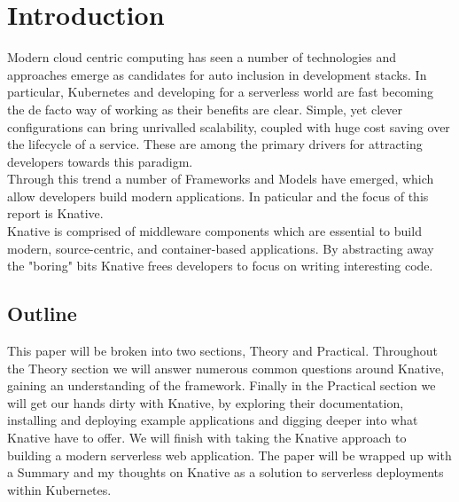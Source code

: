 \section{Introduction}
Modern cloud centric computing has seen a number of technologies and approaches emerge as candidates for auto inclusion in development stacks. In particular,  Kubernetes and developing for a serverless world are fast becoming the de facto way of working as their benefits are clear. Simple, yet clever configurations can bring unrivalled scalability, coupled with huge cost saving over the lifecycle of a service. These are among the primary drivers for attracting developers towards this paradigm.
\\Through this trend a number of Frameworks and Models have emerged, which allow developers build modern applications. In paticular and the focus of this report is Knative.
\\Knative is comprised of middleware components which are essential to build modern, source-centric, and container-based applications. By abstracting away the "boring" bits Knative frees developers to focus on writing interesting code.
\subsection{Outline}
This paper will be broken into two sections, Theory and Practical. Throughout the Theory section we will answer numerous common questions around Knative, gaining an understanding of the framework. Finally in the Practical section we will get our hands dirty with Knative, by exploring their documentation, installing and deploying example applications and digging deeper into what Knative have to offer. We will finish with taking the Knative approach to building a modern serverless web application. The paper will be wrapped up with a Summary and my thoughts on Knative as a solution to serverless deployments within Kubernetes.